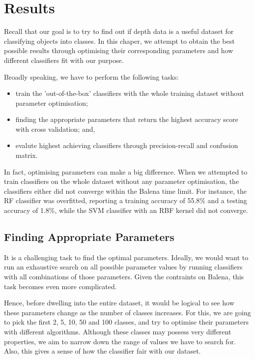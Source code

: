 \chapter{Results} \label{chap:results}

Recall that our goal is to try to find out if depth data is a useful dataset for classifying objects into classes. In this chaper, we attempt to obtain the best possible results through optimising their corresponding parameters and how different classifiers fit with our purpose. 

Broadly speaking, we have to perform the following tasks:

\begin{itemize}
  \item train the 'out-of-the-box' classifiers with the whole training dataset without parameter optimisation; 
  \item finding the appropriate parameters that return the highest accuracy score with cross validation; and,
  \item evalute highest achieving classifiers through precision-recall and confusion matrix.
\end{itemize}

In fact, optimising parameters can make a big difference. When we attempted to train classifiers on the whole dataset without any parameter optimisation, the classifiers either did not converge within the Balena time limit. For instance, the RF classifier was overfitted, reporting a training accuracy of 55.8\% and a testing accuracy of 1.8\%, while the SVM classifier with an RBF kernel did not converge.


\section{Finding Appropriate Parameters}
It is a challenging task to find the optimal parameters. Ideally, we would want to run an exhaustive search on all possible parameter values by running classifiers with all combinations of those parameters. Given the contraints on Balena, this task becomes even more complicated. 

Hence, before dwelling into the entire dataset, it would be logical to see how these parameters change as the number of classes increases. For this, we are going to pick the first 2, 5, 10, 50 and 100 classes, and try to optimise their parameters with different algorithms. Although these classes may possess very different properties, we aim to narrow down the range of values we have to search for. Also, this gives a sense of how the classifier fair with our dataset.

